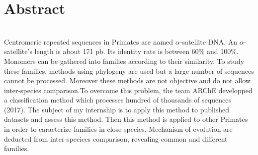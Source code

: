 \documentclass[12pt,a4paper]{article}
\begin{document}
\section*{Abstract}~\\[0.2cm]
Centromeric repeated sequences in Primates are named $\alpha$-satellite DNA. An $\alpha$-satellite's length is about 171 pb. Its identity rate is between 60\% and 100\%. Monomers can be gathered into families according to their similarity. To study these families, methods using phylogeny are used but a large number of sequences cannot be processed. Moreover these methods are not objective and do not allow inter-species comparison.To overcome this problem, the team ARChE developped a classification method which processes hundred of thousands of sequences (2017). The subject of my internship is to apply this method to published datasets and assess this method. Then this method is applied to other Primates in order to caracterize families in close species. Mechanism of evolution are deducted from inter-specices comparison, revealing common and different families. 
\end{document}
